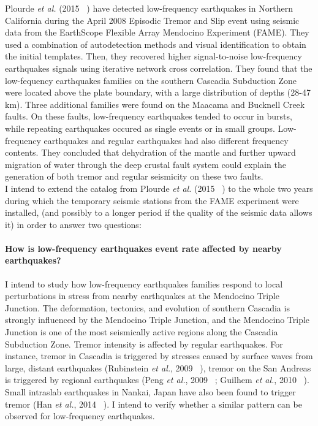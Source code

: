 \documentclass[letterpaper, 12pt]{article}
\begin{document}
Plourde \textit{et al.} (2015 ~\cite{PLO_2015}) have detected low-frequency earthquakes in Northern California during the April 2008 Episodic Tremor and Slip event using seismic data from the EarthScope Flexible Array Mendocino Experiment (FAME). They used a combination of autodetection methods and visual identification to obtain the initial templates. Then, they recovered higher signal-to-noise low-frequency earthquakes signals using iterative network cross correlation. They found that the low-fequency earthquakes families on the southern Cascadia Subduction Zone were located above the plate boundary, with a large distribution of depths (28-47 km). Three additional families were found on the Maacama and Bucknell Creek faults. On these faults, low-frequency earthquakes tended to occur in bursts, while repeating earthquakes occured as single events or in small groups. Low-frequency earthquakes and regular earthquakes had also different frequency contents. They concluded that dehydration of the mantle and further upward migration of water through the deep crustal fault system could explain the generation of both tremor and regular seismicity on these two faults. \\

I intend to extend the catalog from Plourde \textit{et al.} (2015 ~\cite{PLO_2015}) to the whole two years during which the temporary seismic stations from the FAME experiment were installed, (and possibly to a longer period if the quality of the seismic data allows it) in order to answer two questions:

\paragraph{How is low-frequency earthquakes event rate affected by nearby earthquakes?} I intend to study how low-frequency earthquakes families respond to local perturbations in stress from nearby earthquakes at the Mendocino Triple Junction. The deformation, tectonics, and evolution of southern Cascadia is strongly influenced by the Mendocino Triple Junction, and the Mendocino Triple Junction is one of the most seismically active regions along the Cascadia Subduction Zone. Tremor intensity is affected by regular earthquakes. For instance, tremor in Cascadia is triggered by stresses caused by surface waves from large, distant earthquakes (Rubinstein \textit{et al.}, 2009 ~\cite{RUB_2009}), tremor on the San Andreas is triggered by regional earthquakes (Peng \textit{et al.}, 2009 ~\cite{PEN_2009}; Guilhem \textit{et al.}, 2010 ~\cite{GUI_2010}). Small intraslab earthquakes in Nankai, Japan have also been found to trigger tremor (Han \textit{et al.}, 2014 ~\cite{HAN_2014}). I intend to verify whether a similar pattern can be observed for low-frequency earthquakes.
\end{document}
